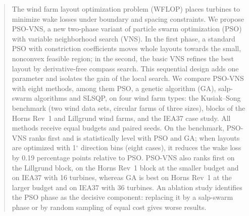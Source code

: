 \begin{frontmatter}
\begin{abstract}
The wind farm layout optimization problem (WFLOP) places turbines to minimize wake losses under boundary and spacing constraints. We propose PSO-VNS, a new two-phase variant of particle swarm optimization (PSO) with variable neighborhood search (VNS). In the first phase, a standard PSO with constriction coefficients moves whole layouts towards the small, nonconvex feasible region; in the second, the basic VNS refines the best layout by derivative-free compass search. This sequential design adds one parameter and isolates the gain of the local search. We compare PSO-VNS with eight methods, among them PSO, a genetic algorithm (GA), salp-swarm algorithms and SLSQP, on four wind farm types: the Kusiak--Song benchmark (two wind data sets, circular farms of three sizes), blocks of the Horns Rev~1 and Lillgrund wind farms, and the IEA37 case study. All methods receive equal budgets and paired seeds. On the benchmark, PSO-VNS ranks first and is statistically level with PSO and GA; when layouts are optimized with 1$^\circ$ direction bins (eight cases), it reduces the wake loss by 0.19 percentage points relative to PSO. PSO-VNS also ranks first on the Lillgrund block, on the Horns Rev~1 block at the smaller budget and on IEA37 with 16 turbines, whereas GA is best on Horns Rev~1 at the larger budget and on IEA37 with 36 turbines. An ablation study identifies the PSO phase as the decisive component: replacing it by a salp-swarm phase or by random sampling of equal cost gives worse results.
\end{abstract}


\end{frontmatter}
